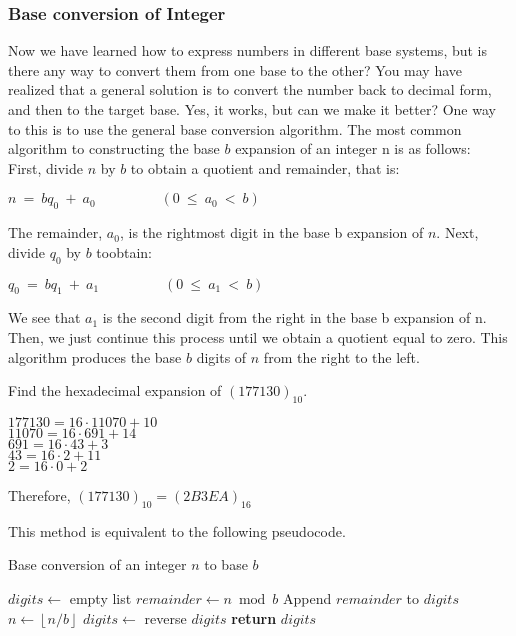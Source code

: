     \subsubsection*{Base conversion of Integer}
    Now we have learned how to express numbers in different base systems, but is there any way to
    convert them from one base to the other? You may have realized that a general solution is to
    convert the number back to decimal form, and then to the target base. Yes, it works, but can we
    make it better? One way to this is to use the general base conversion algorithm.
    The most common algorithm to constructing the base $b$ expansion of an integer n is as follows:\\
First, divide $n$ by $b$ to obtain a quotient and remainder, that is: \\
\begin{center}
	$\displaystyle n\ =\ bq_{0} \ +\ a_{0} \ \ \ \ \ \ \ \ \ \ \ \ \ \ \ \ \ \ \ \ \ ( 0\ \leq \ a_{0} \ < \ b)$
\end{center}
The remainder, $a_0$, is the rightmost digit in the base b expansion of $n$. Next, divide $q_0$ by $b$ toobtain:\\
\begin{center}
	$\displaystyle q_0\ =\ bq_{1} \ +\ a_{1} \ \ \ \ \ \ \ \ \ \ \ \ \ \ \ \ \ \ \ \ \ ( 0\ \leq \ a_{1} \ < \ b)$
\end{center}
We see that $a_1$ is the second digit from the right in the base b expansion of n. Then, we just continue this process
until we obtain a quotient equal to zero. This algorithm produces the base $b$ digits of $n$ from the right to the left.

\begin{example}
	Find the hexadecimal expansion of $(177130)_{10}$.
		\begin{center}
		$177130 = 16 \cdot 11070 + 10$\\
		$11070 = 16 \cdot 691 + 14$\\
		$691 = 16 \cdot 43 + 3$\\
		$43 = 16 \cdot 2 + 11$\\
		$2 = 16 \cdot 0 + 2 $\\
		\end{center}
		Therefore, $(177130)_{10} = (2B3EA)_{16}$
\end{example}
    This method is equivalent to the following pseudocode.
    \begin{algorithm}
        \caption{Base conversion of an integer $n$ to base $b$}
        \begin{algorithmic}[H]
            \State $digits \gets$ empty list
                \State $remainder \gets n \bmod b$
                \State Append $remainder$ to $digits$
                \State $n \gets \left\lfloor n / b \right\rfloor$
            \EndWhile
            \State $digits \gets$ reverse $digits$
            \State \textbf{return} $digits$
        \EndFunction
        \end{algorithmic}
        \end{algorithm}
